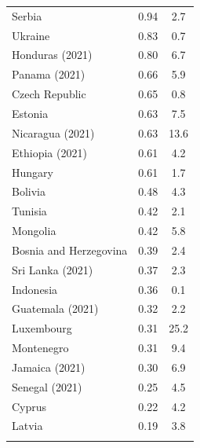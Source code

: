 \begin{longtable}{lcc}
	Serbia                    & 0.94                          & 2.7                               \\
	Ukraine                   & 0.83                          & 0.7                               \\
	Honduras (2021)           & 0.80                          & 6.7                               \\
	Panama (2021)             & 0.66                          & 5.9                               \\
	Czech Republic            & 0.65                          & 0.8                               \\
	Estonia                   & 0.63                          & 7.5                               \\
	Nicaragua (2021)          & 0.63                          & 13.6                              \\
	Ethiopia (2021)           & 0.61                          & 4.2                               \\
	Hungary                   & 0.61                          & 1.7                               \\
	Bolivia                   & 0.48                          & 4.3                               \\
	Tunisia                   & 0.42                          & 2.1                               \\
	Mongolia                  & 0.42                          & 5.8                               \\
	Bosnia and Herzegovina    & 0.39                          & 2.4                               \\
	Sri Lanka (2021)          & 0.37                          & 2.3                               \\
	Indonesia                 & 0.36                          & 0.1                               \\
	Guatemala (2021)          & 0.32                          & 2.2                               \\
	Luxembourg                & 0.31                          & 25.2                              \\
	Montenegro                & 0.31                          & 9.4                               \\
	Jamaica (2021)            & 0.30                          & 6.9                               \\
	Senegal (2021)            & 0.25                          & 4.5                               \\
	Cyprus                    & 0.22                          & 4.2                               \\
	Latvia                    & 0.19                          & 3.8                               \\
	\bottomrule
	\label{tab:Beispieltab-5_DE}
\end{longtable}

